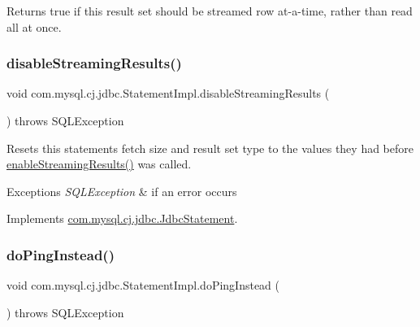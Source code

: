 \begin{DoxyReturn}{Returns}
true if this result set should be streamed row at-\/a-\/time, rather than read all at once. 
\end{DoxyReturn}
\mbox{\label{classcom_1_1mysql_1_1cj_1_1jdbc_1_1_statement_impl_a9e5713d601e7e410e0edb1647b6f9160}} 
\subsubsection{\texorpdfstring{disable\+Streaming\+Results()}{disableStreamingResults()}}
{\footnotesize\ttfamily void com.\+mysql.\+cj.\+jdbc.\+Statement\+Impl.\+disable\+Streaming\+Results (\begin{DoxyParamCaption}{ }\end{DoxyParamCaption}) throws S\+Q\+L\+Exception}

Resets this statements fetch size and result set type to the values they had before \mbox{\hyperlink{classcom_1_1mysql_1_1cj_1_1jdbc_1_1_statement_impl_a973ff5045e258a5c3e156887c116c976}{enable\+Streaming\+Results()}} was called.


\begin{DoxyExceptions}{Exceptions}
{\em S\+Q\+L\+Exception} & if an error occurs \\
\hline
\end{DoxyExceptions}


Implements \mbox{\hyperlink{interfacecom_1_1mysql_1_1cj_1_1jdbc_1_1_jdbc_statement_a11240571041f264e6bdde12ee05355a5}{com.\+mysql.\+cj.\+jdbc.\+Jdbc\+Statement}}.

\mbox{\label{classcom_1_1mysql_1_1cj_1_1jdbc_1_1_statement_impl_a1d04ca76ab91fea81ce3a67550de429b}} 
\subsubsection{\texorpdfstring{do\+Ping\+Instead()}{doPingInstead()}}
{\footnotesize\ttfamily void com.\+mysql.\+cj.\+jdbc.\+Statement\+Impl.\+do\+Ping\+Instead (\begin{DoxyParamCaption}{ }\end{DoxyParamCaption}) throws S\+Q\+L\+Exception\hspace{0.3cm}{\ttfamily [protected]}}

